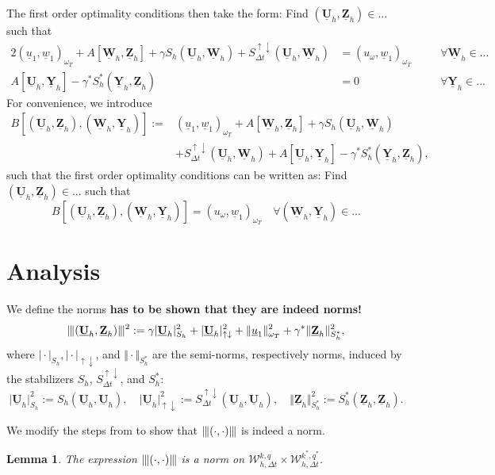 \documentclass[10pt,reqno]{amsart}
\newtheorem{lem}[thm]{Lemma}
\numberwithin{equation}{section}
\newcommand{\tnorm}[1]{\vert\hspace{-0.3mm}\Vert#1\Vert\hspace{-0.3mm}\vert}
\newcommand{\ProdFullyDiscrSpace}[2]{ \mathcal{W}^{ {#1},{#2}}_{h, \Delta t  } }
\newcommand{\Uh}{\underline{\mathbf{U}}_h}
\newcommand{\Yh}{\underline{\mathbf{Y}}_h}
\newcommand{\Zh}{\underline{\mathbf{Z}}_h}
\newcommand{\Wh}{\underline{\mathbf{W}}_h}
\newcommand{\ul}{\underline{u}}
\newcommand{\wl}{\underline{w}}
\newcommand{\Sud}{S^{\uparrow \downarrow}_{\Delta t}}
\begin{document}
\noindent The first order optimality conditions then take the form: Find $(\Uh,\Zh) \in ...$ such that 
\begin{alignat*}{2}
    (\ul_1,\wl_1)_{\omega_T} + A[\Wh,\Zh] + \gamma S_h(\Uh,\Wh) + \Sud(\Uh,\Wh) &= (u_{\omega},\wl_1)_{\omega_T} \quad &&\forall \Wh \in ... \\
    A[\Uh,\Yh] - \gamma^{\ast} S_h^\ast(\Yh,\Zh) &= 0 \quad &&\forall \Yh \in ... 
\end{alignat*}
For convenience, we introduce
\begin{equation}
    \begin{aligned}
        B[(\Uh,\Zh),(\Wh,\Yh)] := &(\ul_1,\wl_1)_{\omega_T} + A[\Wh,\Zh]+ \gamma S_h(\Uh,\Wh) \\
        &+  \Sud(\Uh,\Wh) + A[\Uh,\Yh] - \gamma^{\ast} S_h^\ast(\Yh,\Zh),
    \end{aligned}
\end{equation}
such that the first order optimality conditions can be written as: Find $(\Uh,\Zh) \in ...$ such that
\begin{equation}\label{eq:discreteProblem}
    B[(\Uh,\Zh),(\Wh,\Yh)] = (u_{\omega},\wl_1)_{\omega_T} \quad \forall (\Wh,\Yh) \in ...
\end{equation}


\section{Analysis}
\noindent We define the norms \textbf{has to be shown that they are indeed norms!} 
\begin{equation}
    \tnorm{ (\Uh,\Zh) }^2 := \gamma \vert \Uh \vert^2_{S_h} + \vert \Uh \vert^2_{\uparrow \downarrow} + \Vert \ul_1 \Vert^2_{\omega_T} + \gamma^{\ast} \Vert \Zh \Vert^2_{S_h^\ast},
\end{equation}
where $\vert \cdot \vert_{S_h}, \vert \cdot \vert_{\uparrow \downarrow}$, and $\Vert \cdot \Vert_{S_h^{\ast}}$ are the semi-norms, respectively norms, induced by the stabilizers $S_h$, $\Sud$, and $S_h^{\ast}$:
\begin{equation}
    \vert \Uh \vert^2_{S_h} := S_h(\Uh,\Uh), \quad \vert \Uh \vert^2_{\uparrow \downarrow} := \Sud(\Uh,\Uh), \quad \Vert \Zh \Vert^2_{S_h^{\ast}} := S_h^{\ast}(\Zh,\Zh).
\end{equation}

We modify the steps from \cite{BP24} to show that $\tnorm{(\cdot,\cdot)}$ is indeed a norm. 

\begin{lem}
    The expression $\tnorm{(\cdot,\cdot)}$ is a norm on $\ProdFullyDiscrSpace{k}{q} \times \ProdFullyDiscrSpace{k^\ast}{q^\ast}$.  
\end{lem}
\end{document}
